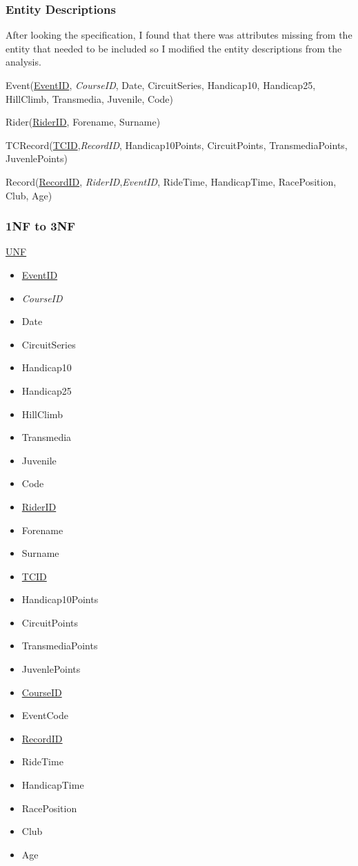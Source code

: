 \subsubsection{Entity Descriptions}
After looking the specification, I found that there was attributes missing from the entity that needed to be included so I modified the entity descriptions from the analysis.

Event(\underline{EventID}, \emph{CourseID}, Date, CircuitSeries, Handicap10, Handicap25, HillClimb, Transmedia, Juvenile, Code)

Rider(\underline{RiderID}, Forename, Surname)

TCRecord(\underline{TCID},\emph{RecordID}, Handicap10Points, CircuitPoints, TransmediaPoints, JuvenlePoints)

Record(\underline{RecordID}, \emph{RiderID},\emph{EventID}, RideTime, HandicapTime, RacePosition, Club, Age)

\subsubsection{1NF to 3NF}

\underline{UNF}

\begin{itemize}
\item \underline{EventID}
\item \emph{CourseID}
\item Date
\item CircuitSeries
\item Handicap10
\item Handicap25
\item HillClimb
\item Transmedia
\item Juvenile
\item Code
\item \underline{RiderID}
\item Forename
\item Surname
\item \underline{TCID}
\item Handicap10Points
\item CircuitPoints
\item TransmediaPoints
\item JuvenlePoints
\item \underline{CourseID}
\item EventCode
\item \underline{RecordID}
\item RideTime
\item HandicapTime
\item RacePosition
\item Club
\item Age
\end{itemize}

